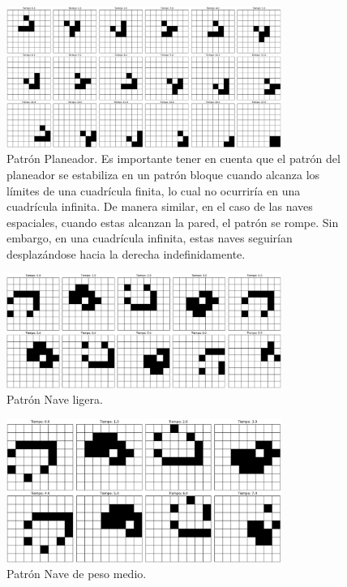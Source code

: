\documentclass[12pt]{article}
\begin{document}

\begin{figure}
  \centering
  \includegraphics[width=0.8\textwidth]{imagenes/nave1.png}
  \caption{Patrón Planeador. Es importante tener en cuenta que el patrón del planeador se estabiliza en un patrón bloque cuando alcanza los límites de una cuadrícula finita, lo cual no ocurriría en una cuadrícula infinita. De manera similar, en el caso de las naves espaciales, cuando estas alcanzan la pared, el patrón se rompe. Sin embargo, en una cuadrícula infinita, estas naves seguirían desplazándose hacia la derecha indefinidamente.\label{img:nave1}}
\end{figure}

\begin{figure}
  \centering
  \includegraphics[width=0.8\textwidth]{imagenes/nave2.png}
  \caption{Patrón Nave ligera.\label{img:nave2}}
\end{figure}

\begin{figure}
  \centering
  \includegraphics[width=0.8\textwidth]{imagenes/nave3.png}
  \caption{Patrón Nave de peso medio.\label{img:nave3}}
\end{figure}
\end{document}
